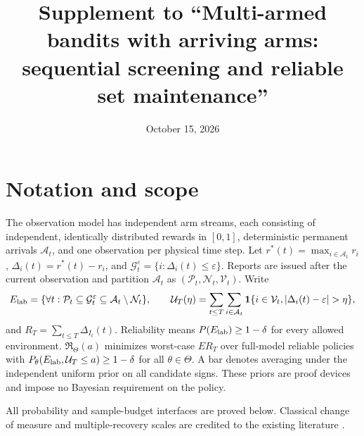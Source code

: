 \documentclass[11pt]{article}
\title{Supplement to ``Multi-armed bandits with arriving arms:\\sequential screening and reliable set maintenance''}
\author{}
\date{October 15, 2026}
\begin{document}
\maketitle
\section*{Notation and scope}
The observation model has independent arm streams, each consisting of
independent, identically distributed rewards in $[0,1]$, deterministic
permanent arrivals $\mathcal{A}_t$, and one observation per physical time step.
Let $r^*(t)=\max_{i\in \mathcal{A}_t}r_i$, $\Delta_i(t)=r^*(t)-r_i$, and
$\mathcal G_t^\varepsilon=\{i:\Delta_i(t)\le\varepsilon\}$. Reports are issued after
the current observation and partition $\mathcal{A}_t$ as $(\mathcal P_t,\mathcal N_t,\mathcal V_t)$. Write
\[
 E_{\rm lab}=\{\forall t:\mathcal P_t\subseteq \mathcal G_t^\varepsilon
                             \subseteq \mathcal{A}_t\setminus \mathcal N_t\},\qquad
 \mathcal U_T(\eta)=\sum_{t\le T}\sum_{i\in \mathcal{A}_t}
 \ind\{i\in \mathcal V_t,|\Delta_i(t)-\varepsilon|>\eta\},
\]
and $R_T=\sum_{t\le T}\Delta_{I_t}(t)$. Reliability means
$P(E_{\rm lab})\ge1-\delta$ for every allowed environment.
$\mathfrak R_\Theta(a)$ minimizes worst-case $ER_T$ over full-model reliable
policies with $P_\theta(E_{\rm lab},\mathcal U_T\le a)\ge1-\delta$ for all
$\theta\in\Theta$. A bar denotes averaging under the independent uniform
prior on all candidate signs. These priors are proof devices and impose no
Bayesian requirement on the policy.

All probability and sample-budget interfaces are proved below. Classical
change of measure and multiple-recovery scales are credited to the existing
literature \citep{kaufmann2016,malloy2014,jamieson2018,mason2020}.






\end{document}
